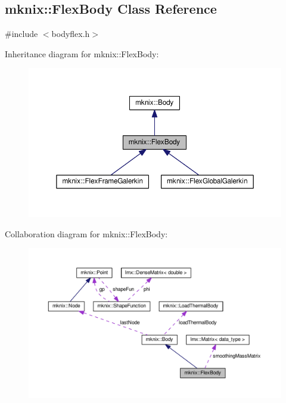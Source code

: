 \hypertarget{classmknix_1_1_flex_body}{}\subsection{mknix\+:\+:Flex\+Body Class Reference}
\label{classmknix_1_1_flex_body}


{\ttfamily \#include $<$bodyflex.\+h$>$}



Inheritance diagram for mknix\+:\+:Flex\+Body\+:\nopagebreak
\begin{figure}[H]
\begin{center}
\leavevmode
\includegraphics[width=350pt]{d5/d29/classmknix_1_1_flex_body__inherit__graph}
\end{center}
\end{figure}


Collaboration diagram for mknix\+:\+:Flex\+Body\+:\nopagebreak
\begin{figure}[H]
\begin{center}
\leavevmode
\includegraphics[width=350pt]{d4/d5c/classmknix_1_1_flex_body__coll__graph}
\end{center}
\end{figure}
